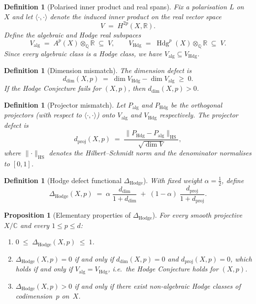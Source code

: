 \documentclass[11pt]{article}
\newtheorem{proposition}[theorem]{Proposition}
\newtheorem{definition}[theorem]{Definition}
\theoremstyle{definition}
\DeclareMathOperator{\Hdg}{Hdg}
\begin{document}

\begin{definition}[Polarised inner product and real spans]
\label{def:polarised}
Fix a polarisation $L$ on $X$ and let $\langle\cdot,\cdot\rangle$
denote the induced inner product on the real vector space
\[
  V \;=\; H^{2p}(X,\mathbb{R}).
\]
Define the \emph{algebraic} and \emph{Hodge} real subspaces
\[
  V_{\mathrm{alg}} \;=\; A^{p}(X)\otimes_{\mathbb{Q}}\mathbb{R}
  \;\subseteq\; V,
  \qquad
  V_{\mathrm{Hdg}} \;=\; \Hdg^{p}(X)\otimes_{\mathbb{Q}}\mathbb{R}
  \;\subseteq\; V.
\]
Since every algebraic class is a Hodge class, we have
$V_{\mathrm{alg}}\subseteq V_{\mathrm{Hdg}}$.
\end{definition}

\begin{definition}[Dimension mismatch]
\label{def:dim-mismatch}
The \emph{dimension defect} is
\[
  d_{\dim}(X,p)
  \;=\;
  \dim V_{\mathrm{Hdg}} - \dim V_{\mathrm{alg}}
  \;\ge\; 0.
\]
If the Hodge Conjecture fails for $(X,p)$, then
$d_{\dim}(X,p)>0$.
\end{definition}

\begin{definition}[Projector mismatch]
\label{def:proj-mismatch}
Let $P_{\mathrm{alg}}$ and $P_{\mathrm{Hdg}}$ be the orthogonal
projectors (with respect to $\langle\cdot,\cdot\rangle$) onto
$V_{\mathrm{alg}}$ and $V_{\mathrm{Hdg}}$ respectively.  The
\emph{projector defect} is
\[
  d_{\mathrm{proj}}(X,p)
  \;=\;
  \frac{\lVert P_{\mathrm{Hdg}} - P_{\mathrm{alg}}\rVert_{\mathrm{HS}}}
       {\sqrt{\dim V}},
\]
where $\lVert\cdot\rVert_{\mathrm{HS}}$ denotes the Hilbert--Schmidt
norm and the denominator normalises to $[0,1]$.
\end{definition}

\begin{definition}[Hodge defect functional $\Delta_{\mathrm{Hodge}}$]
\label{def:delta-hodge}
With fixed weight $\alpha=\tfrac{1}{2}$, define
\[
  \Delta_{\mathrm{Hodge}}(X,p)
  \;=\;
  \alpha\;\frac{d_{\dim}}{1+d_{\dim}}
  \;+\;
  (1-\alpha)\;\frac{d_{\mathrm{proj}}}{1+d_{\mathrm{proj}}}.
\]
\end{definition}

\begin{proposition}[Elementary properties of $\Delta_{\mathrm{Hodge}}$]
\label{prop:delta-props}
For every smooth projective $X/\mathbb{C}$ and every $1\le p\le d$:
\begin{enumerate}[label=\textup{(\roman*)}]
  \item $0 \;\le\; \Delta_{\mathrm{Hodge}}(X,p) \;\le\; 1$.
  \item $\Delta_{\mathrm{Hodge}}(X,p) = 0$ if and only if
        $d_{\dim}(X,p) = 0$ and $d_{\mathrm{proj}}(X,p) = 0$,
        which holds if and only if
        $V_{\mathrm{alg}} = V_{\mathrm{Hdg}}$, i.e.\ the Hodge
        Conjecture holds for $(X,p)$.
  \item $\Delta_{\mathrm{Hodge}}(X,p) > 0$ if and only if there
        exist non-algebraic Hodge classes of codimension~$p$ on~$X$.
\end{enumerate}
\end{proposition}
\end{document}
